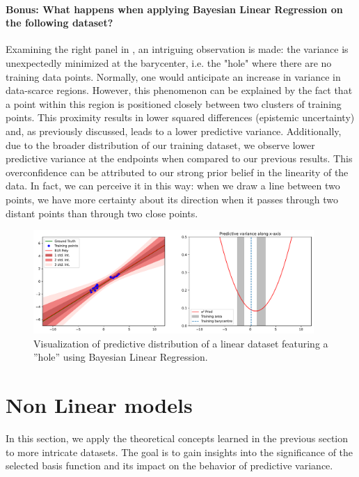 \paragraph*{Bonus: What happens when applying Bayesian Linear Regression on the following dataset?}

Examining the right panel in , an intriguing observation is made: the variance is unexpectedly minimized at the barycenter, i.e. the "hole" where there are no training data points. Normally, one would anticipate an increase in variance in data-scarce regions. However, this phenomenon can be explained by the fact that a point within this region is positioned closely between two clusters of training points. This proximity results in lower squared differences (epistemic uncertainty) and, as previously discussed, leads to a lower predictive variance. Additionally, due to the broader distribution of our training dataset, we observe lower predictive variance at the endpoints when compared to our previous results. This overconfidence can be attributed to our strong prior belief in the linearity of the data. In fact, we can perceive it in this way: when we draw a line between two points, we have more certainty about its direction when it passes through two distant points than through two close points.

\begin{figure}[H]
    \centering
    \includegraphics[width=0.95\textwidth]{phi_linear_hole.pdf}
    \caption{Visualization of predictive distribution of a linear dataset featuring a ''hole'' using Bayesian Linear Regression.}
    \label{fig:phi_linear_hole}
\end{figure}

\section{Non Linear models}

In this section, we apply the theoretical concepts learned in the previous section to more intricate datasets. The goal is to gain insights into the significance of the selected basis function and its impact on the behavior of predictive variance.

